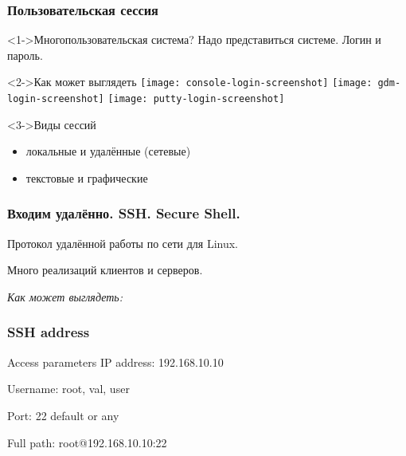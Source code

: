 \begin{frame}
  \frametitle{Пользовательская сессия}

  \begin{center}
    \begin{block}<1->{Многопользовательская система?}
      Надо представиться системе. Логин и пароль.
    \end{block}

    \begin{block}<2->{Как может выглядеть}
      \texttt{[image: console-login-screenshot]}
      \texttt{[image: gdm-login-screenshot]}
      \texttt{[image: putty-login-screenshot]}
    \end{block}

    \begin{block}<3->{Виды сессий}
      \begin{itemize}
        \item локальные и удалённые (сетевые)
        \item текстовые и графические
      \end{itemize}
    \end{block}

  \end{center}

\end{frame}

\begin{frame}[fragile]
  \frametitle{Входим удалённо. SSH. Secure Shell.}

    Протокол удалённой работы по сети для Linux.

    Много реализаций клиентов и серверов.
    \pause

    \emph{Как может выглядеть:}
    \newline
    \emph{ }

\end{frame}

\begin{frame}[fragile]
  \frametitle{SSH address}

\begin{block}{Access parameters}
    IP address: 192.168.10.10 \par
    Username: root, val, user \par
    Port: 22 default or any \par
\end{block}
    Full path: root@192.168.10.10:22
\end{frame}

